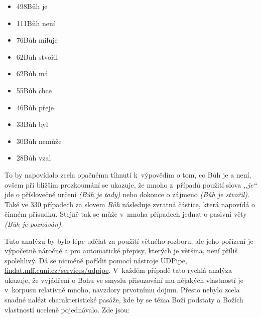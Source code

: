 \begin{itemize}
\item{498\texttimes Bůh je}
\item{111\texttimes Bůh není}
\item{ 76\texttimes Bůh miluje}
\item{ 62\texttimes Bůh stvořil}
\item{ 62\texttimes Bůh má}
\item{ 55\texttimes Bůh chce}
\item{ 46\texttimes Bůh přeje}
\item{ 33\texttimes Bůh byl}
\item{ 30\texttimes Bůh nemůže}
\item{ 28\texttimes Bůh vzal}
\end{itemize}

To by napovídalo zcela opačnému tíhnutí k~výpovědím o tom, co Bůh je a není,
ovšem při bližším prozkoumání se ukazuje, že mnoho z~případů použití slova
\textit{,,je``} jde o příslovečné určení \textit{(Bůh je tady)} nebo dokonce o
zájmeno \textit{(Bůh je stvořil)}. Také ve 330 případech za slovem \textit{Bůh}
následuje zvratná částice, která napovídá o činném přísudku. Stejně tak se může
v~mnoha případech jednat o pasivní věty \textit{(Bůh je poznáván)}.

Tuto analýzu by bylo lépe udělat za použití větného rozboru, ale jeho pořízení
je výpočetně náročné a pro automatické přepisy, kterých je většina, není příliš
spolehlivý. Dá se nicméně pořídit pomocí nástroje UDPipe\cite{udpipe},
\url{lindat.mff.cuni.cz/services/udpipe}. V~každém případě tato rychlá
analýza ukazuje, že vyjádření o Bohu ve smyslu přisuzování mu nějakých
vlastností je v~korpusu relativně mnoho, navzdory prvotnímu dojmu. Přesto nebylo
zcela snadné nalézt charakteristické pasáže, kde by se téma Boží podstaty a Božích
vlastností uceleně pojednávalo. Zde jsou:

